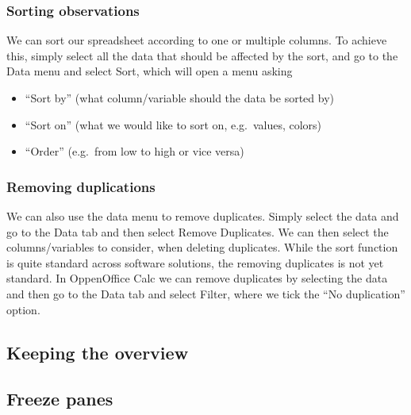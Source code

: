 \documentclass[]{book}
\providecommand{\tightlist}{%
  \setlength{\itemsep}{0pt}\setlength{\parskip}{0pt}}
\begin{document}
\hypertarget{sorting-observations}{%
\subsubsection*{Sorting observations}\label{sorting-observations}}

We can sort our spreadsheet according to one or multiple columns. To achieve this, simply select all the data that should be affected by the sort, and go to the Data menu and select Sort, which will open a menu asking

\begin{itemize}
\tightlist
\item
  ``Sort by'' (what column/variable should the data be sorted by)
\item
  ``Sort on'' (what we would like to sort on, e.g.~values, colors)
\item
  ``Order'' (e.g.~from low to high or vice versa)
\end{itemize}

\hypertarget{removing-duplications}{%
\subsubsection*{Removing duplications}\label{removing-duplications}}

We can also use the data menu to remove duplicates. Simply select the data and go to the Data tab and then select Remove Duplicates. We can then select the columns/variables to consider, when deleting duplicates. While the sort function is quite standard across software solutions, the removing duplicates is not yet standard. In OppenOffice Calc we can remove duplicates by selecting the data and then go to the Data tab and select Filter, where we tick the ``No duplication'' option.

\hypertarget{keeping-the-overview}{%
\subsection{Keeping the overview}\label{keeping-the-overview}}

\hypertarget{freeze-panes}{%
\subsection*{Freeze panes}\label{freeze-panes}}
\end{document}
